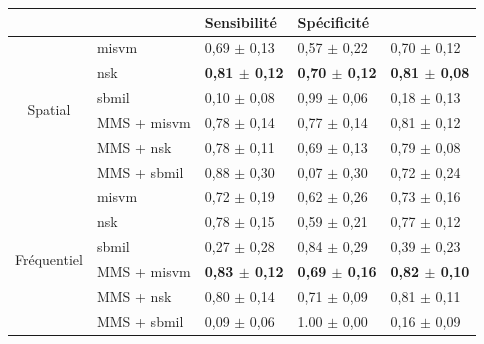 \vspace{25pt}

\begin{table}[H]
    \centering
    \begin{tabular}{cllll}
        \toprule
        \multicolumn{1}{l}{}         &                      & Sensibilité               & Spécificité               & \Fscore{}                 \\ \midrule
        \multirow{6}{*}{Spatial}     & \gls{misvm}          & 0,69 $\pm$ 0,13             & 0,57 $\pm$ 0,22             & 0,70 $\pm$ 0,12             \\
                                     & \gls{nsk}            & \textbf{0,81 $\pm$ 0,12}    & \textbf{0,70 $\pm$ 0,12}    & \textbf{0,81 $\pm$ 0,08}    \\
                                     & \gls{sbmil}          & 0,10 $\pm$ 0,08             & 0,99 $\pm$ 0,06             & 0,18 $\pm$ 0,13             \\
                                     & MMS + \gls{misvm}    & 0,78 $\pm$ 0,14             & 0,77 $\pm$ 0,14             & 0,81 $\pm$ 0,12             \\
                                     & MMS + \gls{nsk}      & 0,78 $\pm$ 0,11             & 0,69 $\pm$ 0,13             & 0,79 $\pm$ 0,08             \\
                                     & MMS + \gls{sbmil}    & 0,88 $\pm$ 0,30             & 0,07 $\pm$ 0,30             & 0,72 $\pm$ 0,24             \\ \midrule
        \multirow{6}{*}{Fréquentiel} & \gls{misvm}          & 0,72 $\pm$ 0,19             & 0,62 $\pm$ 0,26             & 0,73 $\pm$ 0,16             \\
                                     & \gls{nsk}            & 0,78 $\pm$ 0,15             & 0,59 $\pm$ 0,21             & 0,77 $\pm$ 0,12             \\
                                     & \gls{sbmil}          & 0,27 $\pm$ 0,28             & 0,84 $\pm$ 0,29             & 0,39 $\pm$ 0,23             \\
                                     & MMS + \gls{misvm}    & \textbf{0,83 $\pm$ 0,12}    & \textbf{0,69 $\pm$ 0,16}    & \textbf{0,82 $\pm$ 0,10}    \\
                                     & MMS + \gls{nsk}      & 0,80 $\pm$ 0,14             & 0,71 $\pm$ 0,09             & 0,81 $\pm$ 0,11             \\
                                     & MMS + \gls{sbmil}    & 0,09 $\pm$ 0,06             & 1.00 $\pm$ 0,00             & 0,16 $\pm$ 0,09             \\ \midrule

\end{tabular}
\end{table}
